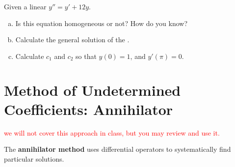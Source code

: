  \begin{question}
  Given a linear \ode{} $y''= y' + 12y$. 
  \begin{enumerate}[(a)]
  \item Is this equation homogeneous or not? How do you know?  \solspace{.25in}
  \item Calculate the general solution of the \ode{}. \solspace{.25in}
  \item Calculate $c_1$ and $c_2$ so that $y(0) = 1$, and $y'(\pi) = 0$.\solspace{.25in}
  \end{enumerate}
  \end{question}










\section{Method of Undetermined Coefficients: Annihilator}

  \textcolor{red}{we will not cover this approach in class, but you may review and use it.}

  The \textbf{annihilator method} uses differential operators to systematically find particular solutions.

